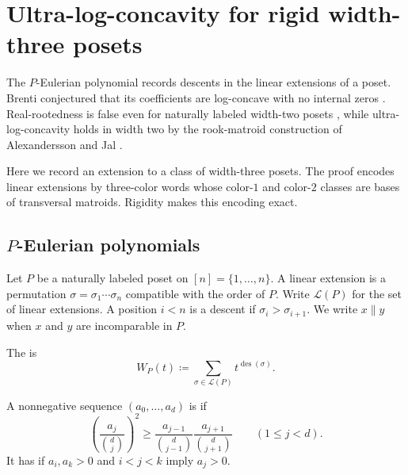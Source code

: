 
\section[widthThreeLogConcavity]{Ultra-log-concavity for rigid width-three posets}

The $P$-Eulerian polynomial records descents in the linear extensions of a
poset. Brenti conjectured that its coefficients are log-concave with no
internal zeros \cite{Brenti1989}. Real-rootedness is false even for naturally
labeled width-two posets \cite{Stembridge2007NeggersStanleyCounter}, while
ultra-log-concavity holds in width two by the rook-matroid construction of
Alexandersson and Jal \cite{AlexanderssonJal2024x}.

Here we record an extension to a class of width-three posets. The proof encodes
linear extensions by three-color words whose color-$1$ and color-$2$ classes
are bases of transversal matroids. Rigidity makes this encoding exact.

\subsection[posetEulerianPolynomials]{$P$-Eulerian polynomials}

Let $P$ be a naturally labeled poset on $[n]=\{1,\dotsc,n\}$. A linear
extension is a permutation $\sigma=\sigma_1\dotsm\sigma_n$ compatible with
the order of $P$. Write $\mathcal L(P)$ for the set of linear extensions. A
position $i<n$ is a descent if $\sigma_i>\sigma_{i+1}$.
We write $x\parallel y$ when $x$ and $y$ are incomparable in $P$.

\begin{definition}
The  is
\[
 W_P(t)\coloneqq
 \sum_{\sigma\in\mathcal L(P)}t^{\operatorname{des}(\sigma)}.
\]
\end{definition}

\begin{definition}
A nonnegative sequence $(a_0,\dotsc,a_d)$ is
 if
\[
 \left(\frac{a_j}{\binom d j}\right)^2
 \geq
 \frac{a_{j-1}}{\binom d{j-1}}
 \frac{a_{j+1}}{\binom d{j+1}}
 \qquad (1\leq j<d).
\]
It has  if $a_i,a_k>0$ and $i<j<k$ imply
$a_j>0$.
\end{definition}

